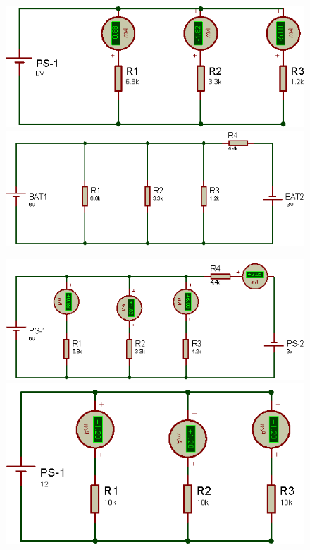 \begin{figure}[h]
	\centering
	\begin{minipage}{0.5\textwidth}
		\centering
		\includegraphics[width=0.8\linewidth]{imagenes/5}
	\end{minipage}%
	\begin{minipage}{0.5\textwidth}
		\centering
		\includegraphics[width=0.8\linewidth]{imagenes/6}
	\end{minipage}
\end{figure}

\begin{figure}[h]
	\centering
	\begin{minipage}{0.5\textwidth}
		\centering
		\includegraphics[width=0.8\linewidth]{imagenes/7}
	\end{minipage}%
	\begin{minipage}{0.5\textwidth}
		\centering
		\includegraphics[width=0.8\linewidth]{imagenes/8}
	\end{minipage}
\end{figure}
